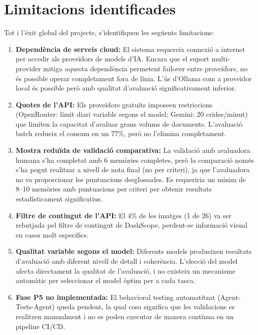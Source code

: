 \documentclass[12pt,a4paper,twoside]{report}
\begin{document}
\section{Limitacions identificades}
\label{sec:limitacions-conclusions}

Tot i l'\'exit global del projecte, s'identifiquen les seg\"uents limitacions:

\begin{enumerate}
    \item \textbf{Depend\`encia de serveis cloud:} El sistema requereix connexi\'o a internet per accedir als prove\"idors de models d'IA. Encara que el suport multi-provider mitiga aquesta depend\`encia permetent failover entre prove\"idors, no \'es possible operar completament fora de l\'inia. L'\'us d'Ollama com a prove\"idor local \'es possible per\`o amb qualitat d'avaluaci\'o significativament inferior.

    \item \textbf{Quotes de l'API:} Els prove\"idors gratu\"its imposeen restriccions (OpenRouter: l\'imit diari variable segons el model; Gemini: 20 crides/minut) que limiten la capacitat d'avaluar grans volums de documents. L'avaluaci\'o batch redueix el consum en un 77\%, per\`o no l'elimina completament.

    \item \textbf{Mostra redu\"ida de validaci\'o comparativa:} La validaci\'o amb avaluadora humana s'ha completat amb 6 mem\`ories completes, per\`o la comparaci\'o nom\'es s'ha pogut realitzar a nivell de nota final (no per criteri), ja que l'avaluadora no va proporcionar les puntuacions desglossades. Es requeriria un m\'inim de 8--10 mem\`ories amb puntuacions per criteri per obtenir resultats estad\'isticament significatius.

    \item \textbf{Filtre de contingut de l'API:} El 4\% de les imatges (1 de 26) va ser rebutjada pel filtre de contingut de DashScope, perdent-se informaci\'o visual en casos molt espec\'ifics.

    \item \textbf{Qualitat variable segons el model:} Diferents models produeixen resultats d'avaluaci\'o amb diferent nivell de detall i coher\`encia. L'elecci\'o del model afecta directament la qualitat de l'avaluaci\'o, i no existeix un mecanisme autom\`atic per seleccionar el model \`optim per a cada tasca.

    \item \textbf{Fase P5 no implementada:} El behavioral testing automatitzat (Agent-Tests-Agent) queda pendent, la qual cosa significa que les validacions es realitzen manualment i no es poden executar de manera cont\'inua en un pipeline CI/CD.


\end{enumerate}
\end{document}
